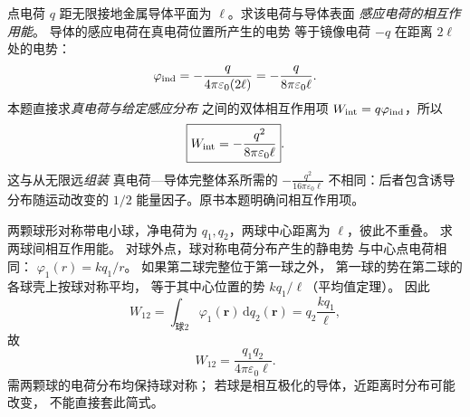 点电荷 $q$ 距无限接地金属导体平面为
$\ell$。求该电荷与导体表面
\emph{感应电荷的相互作用能}。
\exsolution
导体的感应电荷在真电荷位置所产生的电势
等于镜像电荷 $-q$ 在距离 $2\ell$ 处的电势：
\[
\varphi_{\rm ind}=
-\frac{q}{4\pi\varepsilon_0(2\ell)}
=-\frac{q}{8\pi\varepsilon_0\ell}.
\]
本题直接求\emph{真电荷与给定感应分布}
之间的双体相互作用项
$W_{\rm int}=q\varphi_{\rm ind}$，所以
\[
\boxed{W_{\rm int}=
-\frac{q^2}{8\pi\varepsilon_0\ell}}.
\]
\excheck 这与从无限远\emph{组装}
真电荷—导体完整体系所需的
$-\frac{q^2}{16\pi\varepsilon_0\ell}$
不相同：后者包含诱导分布随运动改变的
$1/2$ 能量因子。原书本题明确问相互作用项。

两颗球形对称带电小球，净电荷为
$q_1,q_2$，两球中心距离为
$\ell$，彼此不重叠。
求两球间相互作用能。
\exsolution
对球外点，球对称电荷分布产生的静电势
与中心点电荷相同：
$\varphi_1(r)=kq_1/r$。
如果第二球完整位于第一球之外，
第一球的势在第二球的各球壳上按球对称平均，
等于其中心位置的势
$kq_1/\ell$（平均值定理）。
因此
\[
W_{12}=\int_{\text{球2}}\varphi_1(\bm r)
\,\mathrm dq_2(\bm r)
=q_2\frac{kq_1}{\ell},
\]
故
\[
\boxed{W_{12}=
\frac{q_1q_2}{4\pi\varepsilon_0\ell}}.
\]
\excheck 需两颗球的电荷分布均保持球对称；
若球是相互极化的导体，近距离时分布可能改变，
不能直接套此简式。

